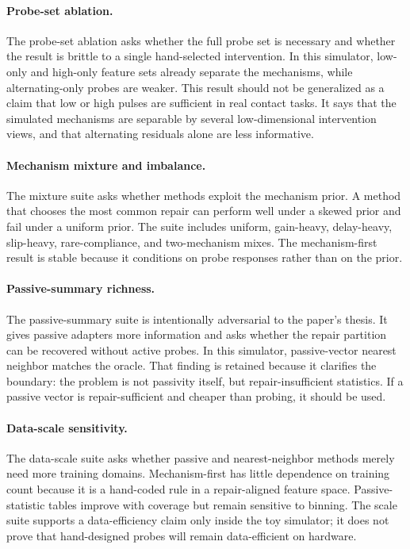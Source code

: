 \documentclass{article}
\begin{document}
\paragraph{Probe-set ablation.}
The probe-set ablation asks whether the full probe set is necessary and whether
the result is brittle to a single hand-selected intervention. In this simulator,
low-only and high-only feature sets already separate the mechanisms, while
alternating-only probes are weaker. This result should not be generalized as a
claim that low or high pulses are sufficient in real contact tasks. It says that
the simulated mechanisms are separable by several low-dimensional intervention
views, and that alternating residuals alone are less informative.

\paragraph{Mechanism mixture and imbalance.}
The mixture suite asks whether methods exploit the mechanism prior. A method
that chooses the most common repair can perform well under a skewed prior and
fail under a uniform prior. The suite includes uniform, gain-heavy, delay-heavy,
slip-heavy, rare-compliance, and two-mechanism mixes. The mechanism-first result
is stable because it conditions on probe responses rather than on the prior.

\paragraph{Passive-summary richness.}
The passive-summary suite is intentionally adversarial to the paper's thesis.
It gives passive adapters more information and asks whether the repair partition
can be recovered without active probes. In this simulator, passive-vector nearest
neighbor matches the oracle. That finding is retained because it clarifies the
boundary: the problem is not passivity itself, but repair-insufficient
statistics. If a passive vector is repair-sufficient and cheaper than probing,
it should be used.

\paragraph{Data-scale sensitivity.}
The data-scale suite asks whether passive and nearest-neighbor methods merely
need more training domains. Mechanism-first has little dependence on training
count because it is a hand-coded rule in a repair-aligned feature space.
Passive-statistic tables improve with coverage but remain sensitive to binning.
The scale suite supports a data-efficiency claim only inside the toy simulator;
it does not prove that hand-designed probes will remain data-efficient on
hardware.
\end{document}

